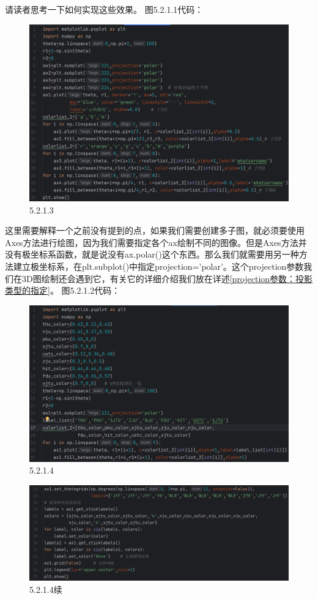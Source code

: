 \documentclass[12pt]{article}
\begin{document}
\noindent 请读者思考一下如何实现这些效果。
\newpage
图5.2.1.1代码：
\begin{figure}[H]
    \centering
    \includegraphics[width=1\linewidth]{极坐标 program2.png}
    \caption{5.2.1.3}
    \label{fig:enter-label}
\end{figure}
这里需要解释一个之前没有提到的点，如果我们需要创建多子图，就必须要使用Axes方法进行绘图，因为我们需要指定各个ax绘制不同的图像。但是Axes方法并没有极坐标系函数，就是说没有ax.polar()这个东西。那么我们就需要用另一种方法建立极坐标系，在plt.subplot()中指定projection='polar'。这个projection参数我们在3D图绘制还会遇到它，有关它的详细介绍我们放在详述\ref{projection参数：投影类型的指定}。
\newpage
图5.2.1.2代码：
\begin{figure}[H]
    \centering
    \includegraphics[width=1\linewidth]{极坐标 program3 1.png}
    \caption{5.2.1.4}
    \label{fig:enter-label}
\end{figure}
\begin{figure}[H]
    \centering
    \includegraphics[width=1\linewidth]{极坐标 program3 2.png}
    \caption{5.2.1.4续}
    \label{fig:enter-label}
\end{figure}
\end{document}
